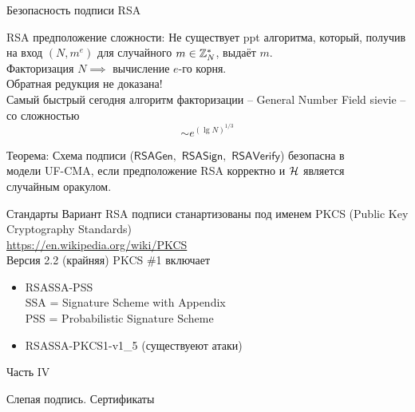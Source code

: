 \documentclass[usenames,dvipsnames,8pt,aspectratio=169]{beamer}
\begin{document}
\begin{frame}{Безопасность подписи RSA}
\Large

{\color{Orange}  RSA предположение сложности:}
Не существует ppt алгоритма, который, получив на вход $(N, m^e)$ для случайного $m \in {{\mathbb Z}}_N^\ast$, выдаёт $m$.\\[10pt]

{\centering Факторизация $N \implies $ вычисление $e$-го корня. \\[5pt] Обратная редукция не доказана! }  \\[15pt]

Самый быстрый сегодня алгоритм факторизации -- General Number Field sievie -- со сложностью
\[
\sim e^{(\lg N)^{1/3}}
\]

\vspace{10pt}

\pause

{\color{Orange}  Теорема:} Схема подписи ($\mathsf{RSAGen},$ $\mathsf{RSASign},$ $\mathsf{RSAVerify}$) безопасна в \\ модели {\color{Orange} UF-CMA}, если {\color{Orange}  предположение RSA корректно} и $\mathcal{H}$ является \\ {\color{Orange}  случайным оракулом.} \\[10pt]

\end{frame}

\begin{frame}{Стандарты}
\Large 
Вариант RSA подписи станартизованы под именем PKCS (Public Key Cryptography Standards)   \\
\url{https://en.wikipedia.org/wiki/PKCS} \\[10pt]

Версия 2.2 (крайняя)  PKCS \#1 включает \\[10pt]
\begin{itemize}
\itemsep10pt
\item RSASSA-PSS \\
SSA = Signature Scheme with Appendix \\[5pt]
PSS =  Probabilistic Signature Scheme
\item  RSASSA-PKCS1-v1\_5 (существуеют атаки)
\end{itemize}

\end{frame}

\begin{frame}
Часть IV \\ [10pt]
\begin{LARGE}
	
	\color{Orange}
	\Huge  Слепая подпись. Сертификаты
	
\end{LARGE}
\end{frame}
\end{document}
